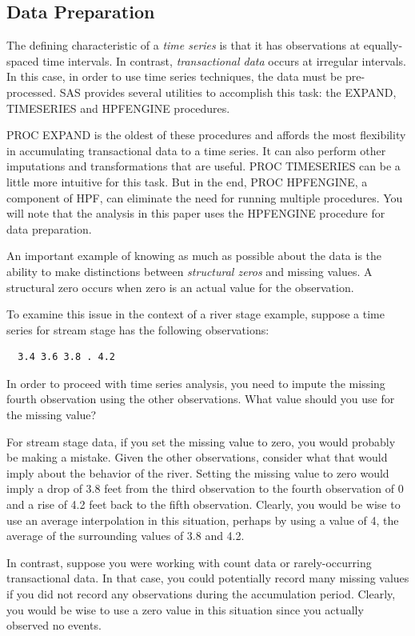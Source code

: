 \documentclass[10pt]{sugconf-ish}
\begin{document}
\subsection{Data Preparation}
The defining characteristic of a \emph{time series} is that it has observations at equally-spaced time intervals. In contrast, \emph{transactional data} occurs at irregular intervals. In this case, 
in order to use time series techniques, the data must be pre-processed. SAS provides several utilities to accomplish this task: the EXPAND, TIMESERIES and HPFENGINE procedures.

PROC EXPAND is the oldest of these procedures and affords the most flexibility in accumulating transactional data to a time series. It can also perform other imputations and transformations that are useful. PROC TIMESERIES can be a little more intuitive for this task. But in the end, PROC HPFENGINE, a component of HPF, can eliminate the need for running multiple procedures. You will note that the analysis in this paper uses the HPFENGINE procedure for data preparation.

An important example of knowing as much as possible about the data is the ability to make distinctions between \emph{structural zeros} and missing values. A structural zero occurs when zero is an actual value for the observation.

To examine this issue in the context of a river stage example, suppose a time series for stream stage has the following observations:
\vspace*{-0.5\baselineskip}
\begin{verbatim}
  3.4 3.6 3.8 . 4.2
\end{verbatim}
\vspace*{-0.5\baselineskip}
In order to proceed with time series analysis, you need to impute the missing fourth observation using the other observations. What value should you use for the missing value?

For stream stage data, if you set the missing value to zero, you would probably be making a mistake. Given the other observations, consider what that would imply about the behavior of the river. Setting the missing value to zero would imply a drop of 3.8 feet from the third observation to the fourth observation of 0 and a rise of 4.2 feet back to the fifth observation. Clearly, you would be wise to use an average interpolation in this situation, perhaps by using a value of 4, the average of the surrounding values of 3.8 and 4.2.

In contrast, suppose you were working with count data or rarely-occurring transactional data. In that case, you could potentially record many missing values if you did not record any observations during the accumulation period. Clearly, you would be wise to use a zero value in this situation since you actually observed no events.
\end{document}
